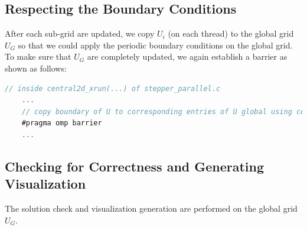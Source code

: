 \documentclass{article}
\begin{document}
\subsection{Respecting the Boundary Conditions}
After each sub-grid are updated, we copy $U_i$ (on each thread) to the global grid $U_G$ so that 
we could apply the periodic boundary conditions on the global grid. To make sure that $U_G$ are completely updated, we again establish 
a barrier as shown as follows: 

\begin{lstlisting}[language=C]
// inside central2d_xrun(...) of stepper_parallel.c
    ...
    // copy boundary of U to corresponding entries of U global using central2d_local_to_global(...)
    #pragma omp barrier
    ...
\end{lstlisting}

\subsection{Checking for Correctness and Generating Visualization}
The solution check and visualization generation are performed on the global grid $U_G$.



\end{document}
